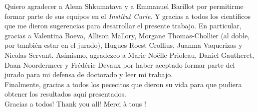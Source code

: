 	Quiero agradecer a Alena Shkumatava y a Emmanuel Barillot por permitirme formar parte de sus equipos en el \textit{Institut Curie}. Y gracias a todos los cient\'ificos que me dieron sugerencias para desarrollar el presente trabajo. En particular, gracias a Valentina Boeva, Allison Mallory, Morgane Thomas-Chollier (al doble, por tambi\'en estar en el jurado), Hugues Roest Crollius, Juanma Vaquerizas y Nicolas Servant. As\'imismo, agradezco a Marie-No\"elle Prioleau, Daniel Gautheret, Daan Noordermeer y Fr\'ed\'eric Devaux por haber aceptado formar parte del jurado para mi defensa de doctorado y leer mi trabajo.\\

	Finalmente, gracias a todos los pececitos que dieron su vida para que pudiera obtener los resultados aqu\'i presentados.\\

	\textexclamdown Gracias a todos! Thank you all! Merci \`a tous !\\



